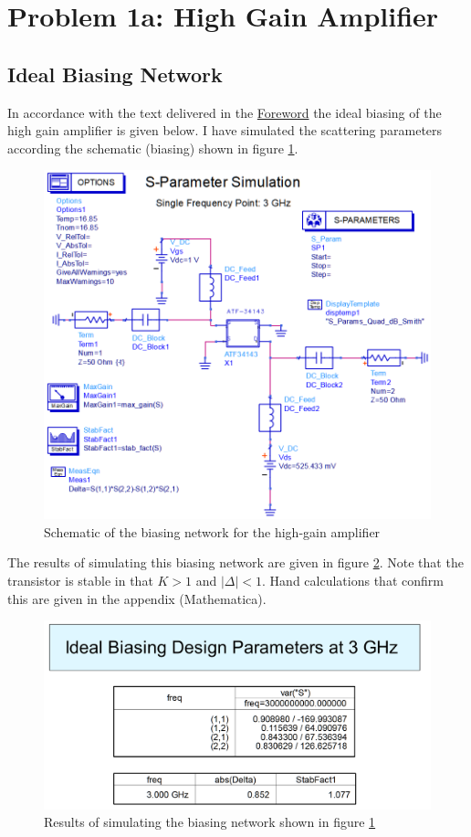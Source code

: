 \section{Problem 1a: High Gain Amplifier}
\label{sec:A2P1}

\subsection{Ideal Biasing Network}
In accordance with the text delivered in the \hyperref[sec:Foreword]{Foreword}
the ideal biasing of the high gain amplifier is given below. I have simulated
the scattering parameters according the schematic (biasing) shown in figure
\ref{fig:A2P1IdealSchematic}.

\begin{figure}[H]
    \centering
    \includegraphics[width=0.8\linewidth]{Images/A2P1IdealSchematic.png}
    \caption{Schematic of the biasing network for the high-gain amplifier}
    \label{fig:A2P1IdealSchematic}
\end{figure}

The results of simulating this biasing network are given in figure
\ref{fig:A2P1IdealBiasingResults}. Note that the transistor is stable in that $K
>1$ and $|\Delta| < 1$. Hand calculations that confirm this are given in the
appendix (Mathematica).

\begin{figure}[H]
    \centering
    \includegraphics[width=0.8\linewidth]{Images/A2P1IdealBiasingResults}
    \caption{Results of simulating the biasing network shown in figure
    \ref{fig:A2P1IdealSchematic}}
    \label{fig:A2P1IdealBiasingResults}
\end{figure}

